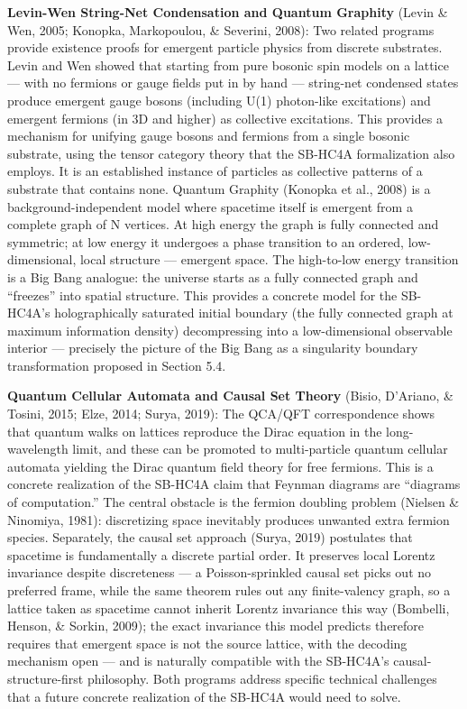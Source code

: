 \documentclass[
]{article}
\begin{document}
\textbf{Levin-Wen String-Net Condensation and Quantum Graphity} (Levin
\& Wen, 2005; Konopka, Markopoulou, \& Severini, 2008): Two related
programs provide existence proofs for emergent particle physics from
discrete substrates. Levin and Wen showed that starting from pure
bosonic spin models on a lattice --- with no fermions or gauge fields
put in by hand --- string-net condensed states produce emergent gauge
bosons (including U(1) photon-like excitations) and emergent fermions
(in 3D and higher) as collective excitations. This provides a mechanism
for unifying gauge bosons and fermions from a single bosonic substrate,
using the tensor category theory that the SB-HC4A formalization also
employs. It is an established instance of particles as collective
patterns of a substrate that contains none. Quantum Graphity (Konopka et
al., 2008) is a background-independent model where spacetime itself is
emergent from a complete graph of N vertices. At high energy the graph
is fully connected and symmetric; at low energy it undergoes a phase
transition to an ordered, low-dimensional, local structure --- emergent
space. The high-to-low energy transition is a Big Bang analogue: the
universe starts as a fully connected graph and ``freezes'' into spatial
structure. This provides a concrete model for the SB-HC4A's
holographically saturated initial boundary (the fully connected graph at
maximum information density) decompressing into a low-dimensional
observable interior --- precisely the picture of the Big Bang as a
singularity boundary transformation proposed in Section 5.4.

\textbf{Quantum Cellular Automata and Causal Set Theory} (Bisio,
D'Ariano, \& Tosini, 2015; Elze, 2014; Surya, 2019): The QCA/QFT
correspondence shows that quantum walks on lattices reproduce the Dirac
equation in the long-wavelength limit, and these can be promoted to
multi-particle quantum cellular automata yielding the Dirac quantum
field theory for free fermions. This is a concrete realization of the
SB-HC4A claim that Feynman diagrams are ``diagrams of computation.'' The
central obstacle is the fermion doubling problem (Nielsen \& Ninomiya,
1981): discretizing space inevitably produces unwanted extra fermion
species. Separately, the causal set approach (Surya, 2019) postulates
that spacetime is fundamentally a discrete partial order. It preserves
local Lorentz invariance despite discreteness --- a Poisson-sprinkled
causal set picks out no preferred frame, while the same theorem rules
out any finite-valency graph, so a lattice taken as spacetime cannot
inherit Lorentz invariance this way (Bombelli, Henson, \& Sorkin, 2009);
the exact invariance this model predicts therefore requires that
emergent space is not the source lattice, with the decoding mechanism
open --- and is naturally compatible with the SB-HC4A's
causal-structure-first philosophy. Both programs address specific
technical challenges that a future concrete realization of the SB-HC4A
would need to solve.
\end{document}
